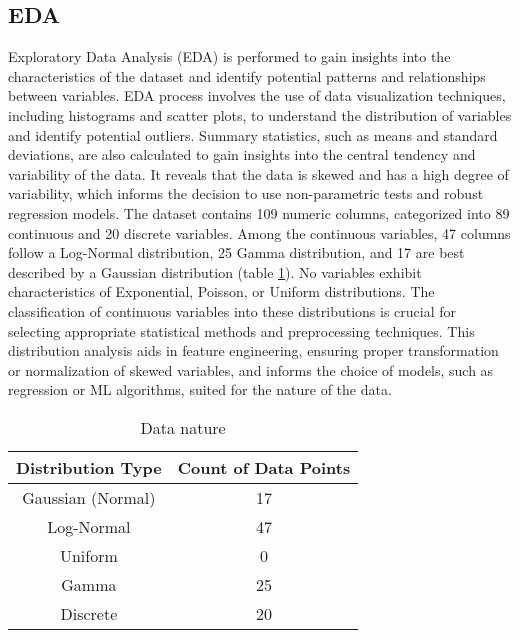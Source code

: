 \documentclass[12pt]{article}
\begin{document}
\subsection{EDA}

Exploratory Data Analysis (EDA) is performed to gain insights into the characteristics of the dataset and identify potential patterns and relationships between variables. EDA process involves the use of data visualization techniques, including histograms and scatter plots, to understand the distribution of variables and identify potential outliers. Summary statistics, such as means and standard deviations, are also calculated to gain insights into the central tendency and variability of the data. It reveals that the data is skewed and has a high degree of variability, which informs the decision to use non-parametric tests and robust regression models. 
The dataset contains 109 numeric columns, categorized into 89 continuous and 20 discrete variables. Among the continuous variables, 47 columns follow a Log-Normal distribution, 25 Gamma distribution, and 17 are best described by a Gaussian distribution (table \ref{tab:Data nature}). No variables exhibit characteristics of Exponential, Poisson, or Uniform distributions. The classification of continuous variables into these distributions is crucial for selecting appropriate statistical methods and preprocessing techniques. This distribution analysis aids in feature engineering, ensuring proper transformation or normalization of skewed variables, and informs the choice of models, such as regression or ML algorithms, suited for the nature of the data.

\begin{table}[h!]
\centering
\caption{Data nature}
\begin{tabular}{|c|c|}
\hline
\textbf{Distribution Type} & \textbf{Count of Data Points} \\
\hline
Gaussian (Normal) & 17 \\
\hline
Log-Normal & 47 \\
\hline
Uniform & 0 \\
\hline
Gamma & 25 \\
\hline
Discrete & 20 \\
\hline
\end{tabular}
\label{tab:Data nature}
\end{table}
\end{document}
